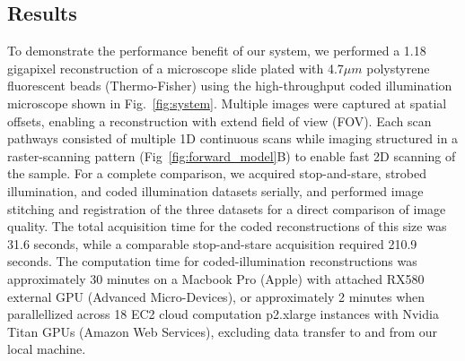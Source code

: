 \subsection{Results}\label{sec:results}
To demonstrate the performance benefit of our system, we performed a 1.18 gigapixel reconstruction of a microscope slide plated with 4.7$\mu m$ polystyrene fluorescent beads (Thermo-Fisher) using the high-throughput coded illumination microscope shown in Fig.~\ref{fig:system}. Multiple images were captured at spatial offsets, enabling a reconstruction with extend field of view (FOV). Each scan pathways consisted of multiple 1D continuous scans while imaging structured in a raster-scanning pattern (Fig~\ref{fig:forward_model}{B}) to enable fast 2D scanning of the sample. For a complete comparison, we acquired stop-and-stare, strobed illumination, and coded illumination datasets serially, and performed image stitching and registration of the three datasets for a direct comparison of image quality. The total acquisition time for the coded reconstructions of this size was 31.6 seconds, while a comparable stop-and-stare acquisition required 210.9 seconds. The computation time for coded-illumination reconstructions was approximately 30 minutes on a Macbook Pro (Apple) with attached RX580 external GPU (Advanced Micro-Devices), or approximately 2 minutes when parallellized across 18 EC2 cloud computation p2.xlarge instances with Nvidia Titan GPUs (Amazon Web Services), excluding data transfer to and from our local machine.

